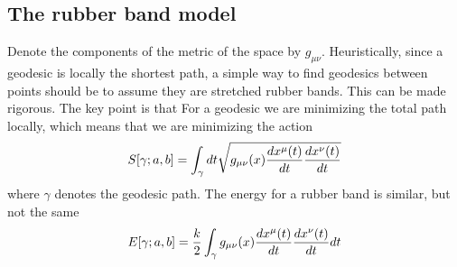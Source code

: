 \documentclass[nofootinbib,preprint,floatfix,titlepage,endfloats,superscriptaddress]{revtex4} %
\begin{document}
\subsection{The rubber band model}
Denote the components of the metric of the space by $g_{\mu\nu}$. 
Heuristically, since a geodesic is locally the shortest path, a simple way to find geodesics between points should be to assume they are stretched rubber bands. This can be made rigorous. The key point is that For a geodesic we are minimizing the total path locally, which means that we are minimizing the action
\begin{equation}
    S[\gamma;a,b] =\int_\gamma dt \sqrt{ g_{\mu\nu}(x) {dx^\mu(t)\over dt}{dx^\nu(t)\over dt}}  \label{eq:Sdl}
\end{equation} 
where $\gamma$ denotes the geodesic path. The energy for a rubber band is similar, but not the same
\begin{equation}
E[\gamma;a,b]= {k\over 2}\int_\gamma g_{\mu\nu}(x) {dx^\mu(t)\over dt}{dx^\nu(t)\over dt} dt \label{eq:Ekx2}
\end{equation}
\end{document}
